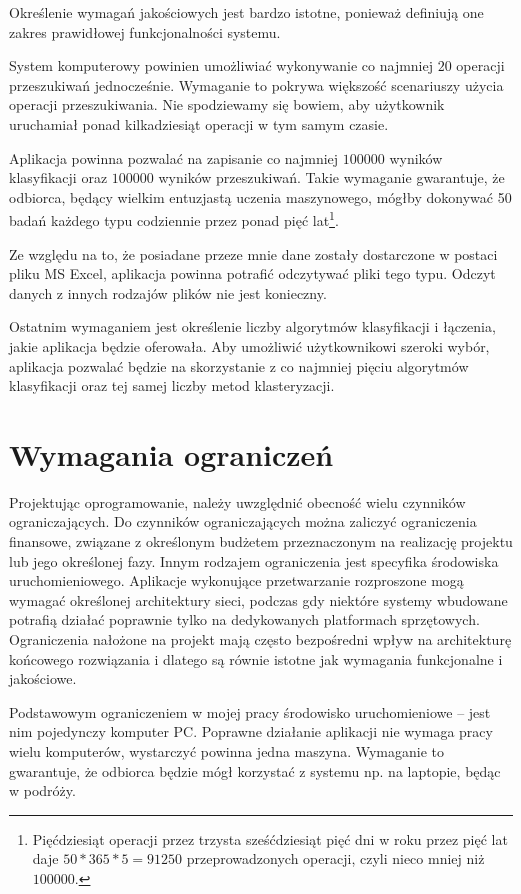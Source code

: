 \documentclass[../thesis.tex]{subfiles}
\begin{document}
Określenie wymagań jakościowych jest bardzo istotne, ponieważ definiują one zakres prawidłowej funkcjonalności systemu.

System komputerowy powinien umożliwiać wykonywanie co najmniej $20$ operacji przeszukiwań jednocześnie. Wymaganie to pokrywa większość scenariuszy użycia operacji przeszukiwania. Nie spodziewamy się bowiem, aby użytkownik uruchamiał ponad kilkadziesiąt operacji w tym samym czasie.

Aplikacja powinna pozwalać na zapisanie co najmniej $100000$ wyników klasyfikacji oraz $100000$ wyników przeszukiwań. Takie wymaganie gwarantuje, że odbiorca, będący wielkim entuzjastą uczenia maszynowego, mógłby dokonywać 50 badań każdego typu codziennie przez ponad pięć lat\footnote{Pięćdziesiąt operacji przez trzysta sześćdziesiąt pięć dni w roku przez pięć lat daje $50 * 365 * 5 = 91250$ przeprowadzonych operacji, czyli nieco mniej niż $100000$.}.

Ze względu na to, że posiadane przeze mnie dane zostały dostarczone w postaci pliku MS Excel, aplikacja powinna potrafić odczytywać pliki tego typu. Odczyt danych z innych rodzajów plików nie jest konieczny.

Ostatnim wymaganiem jest określenie liczby algorytmów klasyfikacji i łączenia, jakie aplikacja będzie oferowała. Aby umożliwić użytkownikowi szeroki wybór, aplikacja pozwalać będzie na skorzystanie z co najmniej pięciu algorytmów klasyfikacji oraz tej samej liczby metod klasteryzacji.

\section{Wymagania ograniczeń}

Projektując oprogramowanie, należy uwzględnić obecność wielu czynników ograniczających. Do czynników ograniczających można zaliczyć ograniczenia finansowe, związane z określonym budżetem przeznaczonym na realizację projektu lub jego określonej fazy. Innym rodzajem ograniczenia jest specyfika środowiska uruchomieniowego. Aplikacje wykonujące przetwarzanie rozproszone mogą wymagać określonej architektury sieci, podczas gdy niektóre systemy wbudowane potrafią działać poprawnie tylko na dedykowanych platformach sprzętowych. Ograniczenia nałożone na projekt mają często bezpośredni wpływ na architekturę końcowego rozwiązania i dlatego są równie istotne jak wymagania funkcjonalne i jakościowe.

Podstawowym ograniczeniem w mojej pracy środowisko uruchomieniowe -- jest nim pojedynczy komputer PC. Poprawne działanie aplikacji nie wymaga pracy wielu komputerów, wystarczyć powinna jedna maszyna. Wymaganie to gwarantuje, że odbiorca będzie mógł korzystać z systemu np. na laptopie, będąc w podróży.
\end{document}
